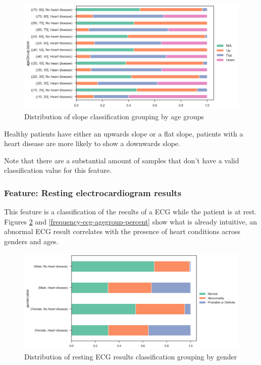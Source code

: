 \begin{figure}
    \caption{Distribution of slope classification grouping by age groups}\label{frequency-slope-agegroup-percent}
    \centering
    \includegraphics[width=\linewidth]{media/frequency-04-agegroup-slope.png}
\end{figure}

Healthy patients have either an upwards slope or a flat slope, patients with a heart disease are more likely to show
a downwards slope.

Note that there are a substantial amount of samples that don't have a valid classification value for this feature.

\subsubsection{Feature: Resting electrocardiogram results}

This feature is a classification of the results of a ECG while the patient is at rest. Figures \ref{frequency-ecg-gender-percent}
and \ref{frequency-ecg-agegroup-percent} show what is already intuitive, an abnormal ECG result correlates with
the presence of heart conditions across genders and ages.

\begin{figure}
    \caption{Distribution of resting ECG results classification grouping by gender}\label{frequency-ecg-gender-percent}
    \centering
    \includegraphics[width=\linewidth]{media/frequency-05-gender-ecg.png}
\end{figure}

